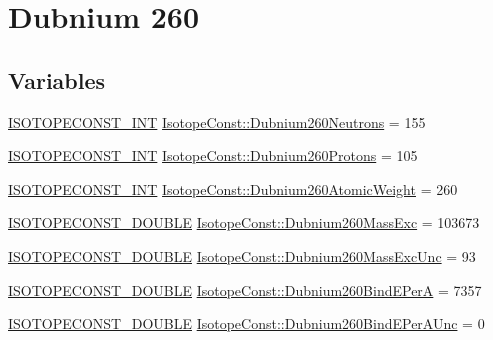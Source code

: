\hypertarget{group___isotope_const-_dubnium-_db260}{}\section{Dubnium 260}
\label{group___isotope_const-_dubnium-_db260}
\subsection*{Variables}
\begin{DoxyCompactItemize}
\item 
\mbox{\hyperlink{group___isotope_const-_macros_ga5f18360b3e99483a35c32d789e62621c}{I\+S\+O\+T\+O\+P\+E\+C\+O\+N\+S\+T\+\_\+\+I\+NT}} \mbox{\hyperlink{group___isotope_const-_dubnium-_db260_ga373af2ff0dc35639a60bab9f4146373a}{Isotope\+Const\+::\+Dubnium260\+Neutrons}} = 155
\item 
\mbox{\hyperlink{group___isotope_const-_macros_ga5f18360b3e99483a35c32d789e62621c}{I\+S\+O\+T\+O\+P\+E\+C\+O\+N\+S\+T\+\_\+\+I\+NT}} \mbox{\hyperlink{group___isotope_const-_dubnium-_db260_ga1aa3e99481a9e5d966213867be747bcb}{Isotope\+Const\+::\+Dubnium260\+Protons}} = 105
\item 
\mbox{\hyperlink{group___isotope_const-_macros_ga5f18360b3e99483a35c32d789e62621c}{I\+S\+O\+T\+O\+P\+E\+C\+O\+N\+S\+T\+\_\+\+I\+NT}} \mbox{\hyperlink{group___isotope_const-_dubnium-_db260_ga7059e4e33c247bd00a7efe8e8356bbd3}{Isotope\+Const\+::\+Dubnium260\+Atomic\+Weight}} = 260
\item 
\mbox{\hyperlink{group___isotope_const-_macros_ga8f45a7272ce02c0b4c65c44636ed719a}{I\+S\+O\+T\+O\+P\+E\+C\+O\+N\+S\+T\+\_\+\+D\+O\+U\+B\+LE}} \mbox{\hyperlink{group___isotope_const-_dubnium-_db260_ga87e2d7eb7bba465c5e6235e0dfe5fc5d}{Isotope\+Const\+::\+Dubnium260\+Mass\+Exc}} = 103673
\item 
\mbox{\hyperlink{group___isotope_const-_macros_ga8f45a7272ce02c0b4c65c44636ed719a}{I\+S\+O\+T\+O\+P\+E\+C\+O\+N\+S\+T\+\_\+\+D\+O\+U\+B\+LE}} \mbox{\hyperlink{group___isotope_const-_dubnium-_db260_ga82e8904c39689438874906e7fad39088}{Isotope\+Const\+::\+Dubnium260\+Mass\+Exc\+Unc}} = 93
\item 
\mbox{\hyperlink{group___isotope_const-_macros_ga8f45a7272ce02c0b4c65c44636ed719a}{I\+S\+O\+T\+O\+P\+E\+C\+O\+N\+S\+T\+\_\+\+D\+O\+U\+B\+LE}} \mbox{\hyperlink{group___isotope_const-_dubnium-_db260_ga88ccf073738560523b8892c3d4b61dd8}{Isotope\+Const\+::\+Dubnium260\+Bind\+E\+PerA}} = 7357
\item 
\mbox{\hyperlink{group___isotope_const-_macros_ga8f45a7272ce02c0b4c65c44636ed719a}{I\+S\+O\+T\+O\+P\+E\+C\+O\+N\+S\+T\+\_\+\+D\+O\+U\+B\+LE}} \mbox{\hyperlink{group___isotope_const-_dubnium-_db260_ga51fdf24b8e566b87c4753aa0a578e65e}{Isotope\+Const\+::\+Dubnium260\+Bind\+E\+Per\+A\+Unc}} = 0

\end{DoxyCompactItemize}
